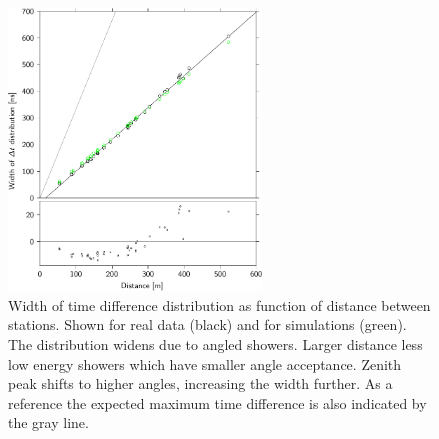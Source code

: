 \begin{figure}
    \centering
    \includegraphics[width=0.6\textwidth]
                    {plots/cluster/distance_v_width_sim}
    \caption{Width of time difference distribution as function of distance between stations. Shown for real data (black) and for simulations (green). The distribution widens due to angled showers. Larger distance less low energy showers which have smaller angle acceptance. Zenith peak shifts to higher angles, increasing the width further. As a reference the expected maximum time difference is also indicated by the gray line.}
    \label{fig:distance_v_width_sim}
\end{figure}

